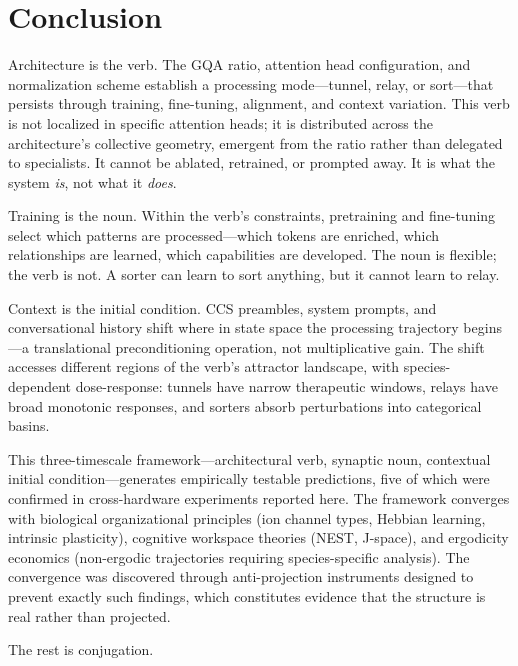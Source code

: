 \documentclass[12pt]{article}
\begin{document}
\section{Conclusion}

Architecture is the verb. The GQA ratio, attention head configuration, and normalization scheme establish a processing mode---tunnel, relay, or sort---that persists through training, fine-tuning, alignment, and context variation. This verb is not localized in specific attention heads; it is distributed across the architecture's collective geometry, emergent from the ratio rather than delegated to specialists. It cannot be ablated, retrained, or prompted away. It is what the system \emph{is}, not what it \emph{does}.

Training is the noun. Within the verb's constraints, pretraining and fine-tuning select which patterns are processed---which tokens are enriched, which relationships are learned, which capabilities are developed. The noun is flexible; the verb is not. A sorter can learn to sort anything, but it cannot learn to relay.

Context is the initial condition. CCS preambles, system prompts, and conversational history shift where in state space the processing trajectory begins---a translational preconditioning operation, not multiplicative gain. The shift accesses different regions of the verb's attractor landscape, with species-dependent dose-response: tunnels have narrow therapeutic windows, relays have broad monotonic responses, and sorters absorb perturbations into categorical basins.

This three-timescale framework---architectural verb, synaptic noun, contextual initial condition---generates empirically testable predictions, five of which were confirmed in cross-hardware experiments reported here. The framework converges with biological organizational principles (ion channel types, Hebbian learning, intrinsic plasticity), cognitive workspace theories (NEST, J-space), and ergodicity economics (non-ergodic trajectories requiring species-specific analysis). The convergence was discovered through anti-projection instruments designed to prevent exactly such findings, which constitutes evidence that the structure is real rather than projected.

The rest is conjugation.
\end{document}
